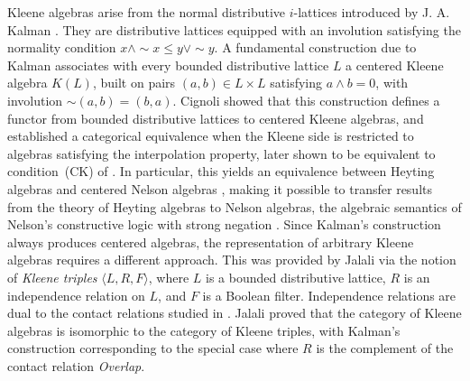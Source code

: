 \documentclass{article}
\begin{document}
Kleene algebras arise from the normal distributive $i$-lattices introduced by J. A. Kalman \cite{kalman1958lattices}. They are distributive lattices equipped with an involution satisfying the normality condition
\(x \wedge \sim x \leq y \vee \sim y\).
A fundamental construction due to Kalman associates with every bounded distributive lattice \(L\) a centered Kleene algebra \(K(L)\), built on pairs \((a,b)\in L\times L\) satisfying \(a\wedge b=0\), with involution \(\sim(a,b)=(b,a)\). Cignoli \cite{cignoli1986class} showed that this construction defines a functor from bounded distributive lattices to centered Kleene algebras, and established a categorical equivalence when the Kleene side is restricted to algebras satisfying the interpolation property, later shown to be equivalent to condition~(CK) of \cite{2017kleene}. In particular, this yields an equivalence between Heyting algebras and centered Nelson algebras \cite{cignoli1986class,sendlewski1990nelson}, making it possible to transfer results from the theory of Heyting algebras to Nelson algebras, the algebraic semantics of Nelson's constructive logic with strong negation \cite{nelson1949constructible,Rasiowa58}. Since Kalman's construction always produces centered algebras, the representation of arbitrary Kleene algebras requires a different approach. This was provided by Jalali \cite{jalali, viglizzo99algebras} via the notion
of \emph{Kleene triples} $\langle L, R, F \rangle$, where $L$ is a bounded
distributive lattice, $R$ is an independence relation on $L$, and $F$ is a
Boolean filter. Independence relations are dual to the contact relations
studied in \cite{duntsch2006topological, duntsch2008distributive}. Jalali
proved that the category of Kleene algebras is isomorphic to the category of
Kleene triples, with Kalman's construction corresponding to the special case
where $R$ is the complement of the contact relation \textit{Overlap}.
\end{document}
